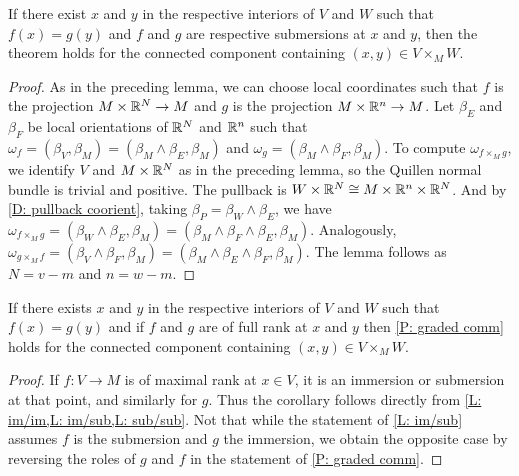 \begin{lemma}\label{L: sub/sub}
If there exist $x$ and $y$ in the respective interiors of $V$ and $W$ such that  $f(x)=g(y)$ and $f$ and $g$ are respective submersions at $x$ and $y$, then the theorem holds for the connected component containing $(x,y)\in V\times_MW$.
\end{lemma}
\begin{proof}
As in the preceding lemma, we can choose local coordinates such that $f$ is the projection $M\times \mathbb{R}^N\to M$ and $g$ is the projection $M\times \mathbb{R}^n\to M$. Let $\beta_E$ and $\beta_F$ be local orientations of $\mathbb{R}^N$ and $\mathbb{R}^n$ such that $\omega_f=(\beta_V,\beta_M)=(\beta_M\wedge \beta_E,\beta_M)$ and $\omega_g=(\beta_M\wedge \beta_F,\beta_M)$. To compute $\omega_{f\times_Mg}$, we identify $V$ and $M\times \mathbb{R}^N$ as in the preceding lemma, so the Quillen normal bundle is trivial and positive. The pullback is $W\times \mathbb{R}^N\cong M\times \mathbb{R}^n\times \mathbb{R}^N$. And by \cref{D: pullback coorient}, taking $\beta_P=\beta_W\wedge \beta_E$, we have  $\omega_{f\times_Mg}=(\beta_W\wedge \beta_E,\beta_M)=(\beta_M\wedge \beta_F\wedge \beta_E,\beta_M)$. Analogously, $\omega_{g\times_Mf}=(\beta_V\wedge \beta_F,\beta_M)=(\beta_M\wedge \beta_E\wedge \beta_F,\beta_M)$. The lemma follows as $N=v-m$ and $n=w-m$.
\end{proof}

\begin{corollary}\label{C: if full}
If there exists $x$ and $y$ in the respective interiors of $V$ and $W$ such that  $f(x)=g(y)$ and if $f$ and $g$ are of full rank at $x$ and $y$ then \cref{P: graded comm} holds for the connected component containing $(x,y)\in V\times_MW$.
\end{corollary}


\begin{proof}
If $f:V\to M$ is of maximal rank at $x\in V$, it is an immersion or submersion at that point, and similarly for $g$. Thus the corollary follows directly from \cref{L: im/im,L: im/sub,L: sub/sub}. Not that while the statement of \cref{L: im/sub} assumes $f$ is the submersion and $g$ the immersion, we obtain the opposite case by reversing the roles of $g$ and $f$ in the statement of \cref{P: graded comm}.
\end{proof}

\begin{comment}
 If they are both immersions, apply Lemma \ref{L: im/im}. If $f$ is a submersion, it is also a submersion in a neighborhood of $U$ and so it is a submersion on a neighborhood $U$ of $x$. Let $A$ be the intersection of $U$ with the interior of $V$.
By the transversality of $f$ and $g$, if $g(y)=f(x)$, there must be points in a neighborhood of $B$ of $y$ in $W$ that map to $f(A)$, and as a map is a submersion or immersion on an open set, there is a $y'$ in the interior of $B$ that maps to $f(A)$. Taking $x'$ in $f^{-1}(y')$, if $g$ is an immersion we apply Lemma \ref{L: im/sub} to $x', y'$, and if $g$ is a submersion we apply Lemma \ref{L: sub/sub}.
If $f$ is an immersion and $g$ a submersion, we reverse the roles in the argument.
\end{comment}




